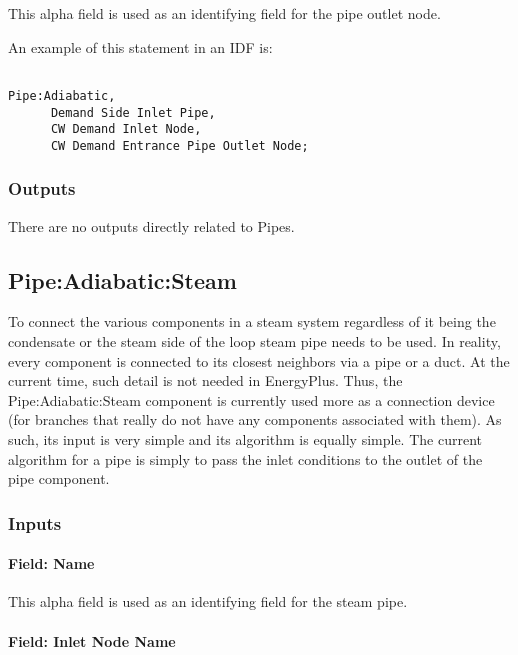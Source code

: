 This alpha field is used as an identifying field for the pipe outlet node.

An example of this statement in an IDF is:

\begin{lstlisting}

Pipe:Adiabatic,
      Demand Side Inlet Pipe,
      CW Demand Inlet Node,
      CW Demand Entrance Pipe Outlet Node;
\end{lstlisting}

\subsubsection{Outputs}\label{outputs-4-009}

There are no outputs directly related to Pipes.

\subsection{Pipe:Adiabatic:Steam}\label{pipeadiabaticsteam}

To connect the various components in a steam system regardless of it being the condensate or the steam side of the loop steam pipe needs to be used. In reality, every component is connected to its closest neighbors via a pipe or a duct. At the current time, such detail is not needed in EnergyPlus. Thus, the Pipe:Adiabatic:Steam component is currently used more as a connection device (for branches that really do not have any components associated with them). As such, its input is very simple and its algorithm is equally simple. The current algorithm for a pipe is simply to pass the inlet conditions to the outlet of the pipe component.

\subsubsection{Inputs}\label{inputs-5-017}

\paragraph{Field: Name}\label{field-name-5-013}

This alpha field is used as an identifying field for the steam pipe.

\paragraph{Field: Inlet Node Name}\label{field-inlet-node-name-1-000}


